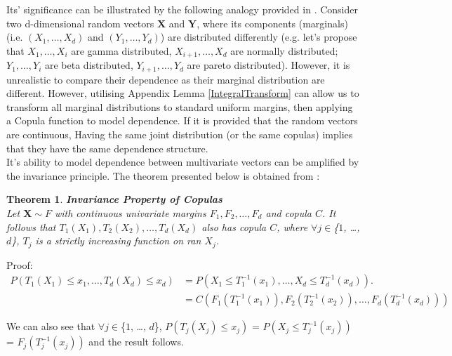 \documentclass[12pt]{report}
\newtheorem{theorem}{Theorem}[subsection]
\newcommand{\1}{\mathbf{1}}
\begin{document}
Its' significance can be illustrated by the following analogy provided in \cite{HofertBook}. Consider two d-dimensional random vectors $\boldsymbol{X}$  and $\boldsymbol{Y}$, where its components (marginals) (i.e. $(X_{1}, \dots, X_{d})$ and $(Y_{1}, \dots, Y_{d})$) are distributed differently (e.g. let's propose that $X_{1}, \dots, X_{i}$ are gamma distributed, $X_{i+1}, \dots, X_{d}$ are normally distributed; $Y_{1}, \dots, Y_{i}$ are beta distributed, $Y_{i+1}, \dots, Y_{d}$ are pareto distributed). However, it is unrealistic to compare their dependence as their marginal distribution are different. However, utilising Appendix Lemma \ref{IntegralTransform} can allow us to transform all marginal distributions to standard uniform margins, then applying a Copula function to model dependence. If it is provided that the random vectors are continuous, Having the same joint distribution (or the same copulas) implies that they have the same dependence structure.\\
\vspace{0.5cm}
It's ability to model dependence between multivariate vectors can be amplified by the invariance principle. The theorem presented below is obtained from \cite{HofertBook}: \\

\begin{theorem}\label{CopulaInvariance}
\textbf{Invariance Property of Copulas} \\

Let $\boldsymbol{X} \sim F$ with continuous univariate margins $F_{1}, F_{2}, \dots, F_{d}$ and copula $C$. It follows that $T_{1}(X_{1}), T_{2}(X_{2}), \dots, T_{d}(X_{d})$ also has copula $C$, where $\forall j \in $\{$1$, \dots, $d$\}, $T_{j}$ is a strictly increasing function on ran $X_{j}$. 
\end{theorem}

Proof:
\begin{align*}
P(T_{1}(X_{1}) \le x_{1}, \dots, T_{d}(X_{d}) \le x_{d}) &= P(X_{1} \le T_{1}^{-1}(x_{1}), \dots, X_{d} \le T_{d}^{-1}(x_{d})).\\
&= C(F_{1}(T^{-1}_{1}(x_{1})),F_{2}(T^{-1}_{2}(x_{2})), \dots, F_{d}(T^{-1}_{d}(x_{d})))
\end{align*}

We can also see that $\forall j \in $\{$1$, \dots, $d$\}, $P(T_{j}(X_{j}) \le x_{j})$ = $P(X_{j} \le T_{j}^{-1}(x_{j}))$ = $F_{j}(T^{-1}_{j}(x_{j}))$
and the result follows.

\vspace{0.5cm}
\end{document}
